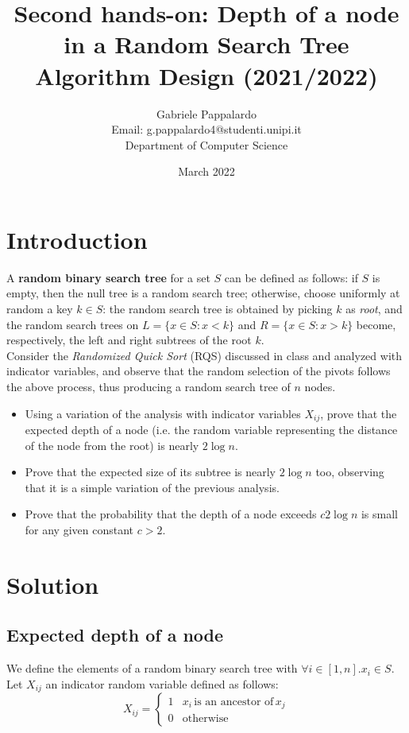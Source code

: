 \documentclass{article}
\title{Second hands-on: Depth of a node in a Random Search Tree\\[1ex] \large Algorithm Design (2021/2022)}
\author{Gabriele Pappalardo\\Email: g.pappalardo4@studenti.unipi.it\\Department of Computer Science}
\date{March 2022}
\begin{document}
\maketitle

\section{Introduction}

A \textbf{random binary search tree} for a set $S$ can be defined as follows: if $S$ is empty, then the null tree is a random search tree; otherwise, choose uniformly at random a key $k \in S$: the random search tree is obtained by picking $k$ as \textit{root}, and the random search trees on $L = \{x \in S : x < k\}$ and $R = \{x \in S : x > k\}$ become, respectively, the left and right subtrees of the root $k$.\\

\noindent Consider the \textit{Randomized Quick Sort} (RQS) discussed in class and analyzed with indicator variables, and observe that the random selection of the pivots follows the above process, thus producing a random search tree of $n$ nodes.

\begin{itemize}
    \item Using a variation of the analysis with indicator variables $X_{ij}$, prove that the expected depth of a node (i.e. the random variable representing the distance of the node from the root) is nearly $2 \log n$. 
    \item Prove that the expected size of its subtree is nearly $2 \log n$ too, observing that it is a simple variation of the previous analysis.
    \item Prove that the probability that the depth of a node exceeds $c2 \log n$ is small for any given constant $c > 2$. 
\end{itemize}

\section{Solution}

\subsection{Expected depth of a node}

We define the elements of a random binary search tree with $\forall i \in [1, n] . x_i \in S$. Let $X_{ij}$ an indicator random variable defined as follows:
\begin{equation}
    X_{ij} = \begin{cases}
    1 & x_i \, \textrm{is an ancestor of} \, x_j\\
    0 & \textrm{otherwise}
    \end{cases}
\end{equation}
\end{document}
